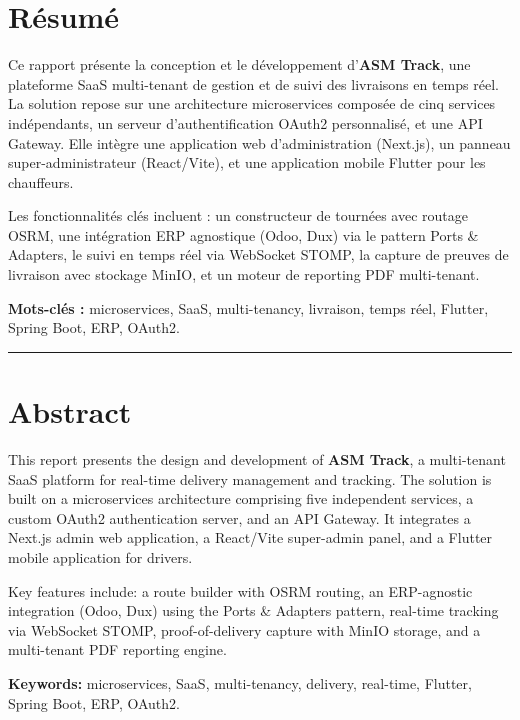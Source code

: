 \chapter*{Résumé}

Ce rapport présente la conception et le développement d'\textbf{ASM Track}, une plateforme SaaS multi-tenant de gestion et de suivi des livraisons en temps réel. La solution repose sur une architecture microservices composée de cinq services indépendants, un serveur d'authentification OAuth2 personnalisé, et une API Gateway. Elle intègre une application web d'administration (Next.js), un panneau super-administrateur (React/Vite), et une application mobile Flutter pour les chauffeurs.

Les fonctionnalités clés incluent : un constructeur de tournées avec routage OSRM, une intégration ERP agnostique (Odoo, Dux) via le pattern Ports \& Adapters, le suivi en temps réel via WebSocket STOMP, la capture de preuves de livraison avec stockage MinIO, et un moteur de reporting PDF multi-tenant.

\textbf{Mots-clés :} microservices, SaaS, multi-tenancy, livraison, temps réel, Flutter, Spring Boot, ERP, OAuth2.

\vspace{1cm}
\hrule
\vspace{0.5cm}

\chapter*{Abstract}

This report presents the design and development of \textbf{ASM Track}, a multi-tenant SaaS platform for real-time delivery management and tracking. The solution is built on a microservices architecture comprising five independent services, a custom OAuth2 authentication server, and an API Gateway. It integrates a Next.js admin web application, a React/Vite super-admin panel, and a Flutter mobile application for drivers.

Key features include: a route builder with OSRM routing, an ERP-agnostic integration (Odoo, Dux) using the Ports \& Adapters pattern, real-time tracking via WebSocket STOMP, proof-of-delivery capture with MinIO storage, and a multi-tenant PDF reporting engine.

\textbf{Keywords:} microservices, SaaS, multi-tenancy, delivery, real-time, Flutter, Spring Boot, ERP, OAuth2.
